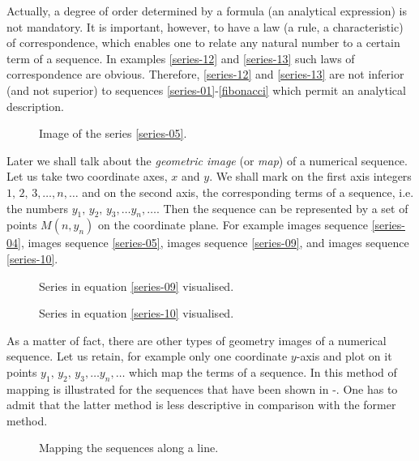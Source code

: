 {\athr Actually, a degree of order determined by a formula (an analytical expression) is not mandatory. It is important, however, to have a law (a rule, a characteristic) of correspondence, which enables one to relate any natural number to a certain term of a sequence. In examples \eqref{series-12} and \eqref{series-13} such laws of correspondence are obvious. Therefore,
\eqref{series-12} and \eqref{series-13} are not inferior (and not superior) to sequences \eqref{series-01}-\eqref{fibonacci} which permit an analytical description.
 \begin{figure}[!h]
\centering

\caption{Image of the series \eqref{series-05}.}
\label{fig-03}
\end{figure}
 Later we shall talk about the \emph{geometric image} (or \emph{map}) of a numerical sequence. Let us take two coordinate axes, $x$ and $y$. We shall mark on the first axis integers $1, \, 2, \, 3, \ldots, n, \ldots$ and on the second axis, the corresponding terms of a sequence, i.e. the numbers $y_{1}, \, y_{2}, \, y_{3}, \ldots y_{n}, \ldots$. Then the sequence can be represented by a set of points $M (n, y_{n})$ on the coordinate plane. For example  images sequence \eqref{series-04},  images sequence \eqref{series-05},  images sequence \eqref{series-09}, and  images sequence \eqref{series-10}.
\begin{figure}[!h]
\centering

\caption{Series in equation \eqref{series-09} visualised.}
\label{fig-04}

\end{figure}
\begin{figure}[!h]
\centering

\caption{Series in equation \eqref{series-10} visualised.}
\label{fig-05}
\end{figure}

As a matter of fact, there are other types of geometry images of a numerical sequence. Let us retain, for example only one coordinate $y$-axis and plot on it points  $y_{1}, \, y_{2}, \, y_{3}, \ldots y_{n}, \ldots$ which map the terms of a sequence. In  this method of mapping is illustrated for the sequences that have been shown in -. One has to admit that the latter method is less descriptive in comparison with the former method.
\begin{figure}[!h]
\centering

\caption{Mapping the sequences along a line.}
\label{fig-06}
\end{figure}

}
